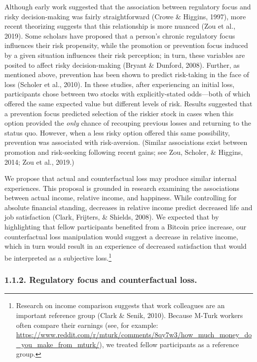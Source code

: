 \documentclass[man,floatsintext]{apa6}
\let\rmarkdownfootnote\footnote%
\def\footnote{\protect\rmarkdownfootnote}
\begin{document}
Although early work suggested that the association between regulatory focus and risky decision-making was fairly straightforward (Crowe \& Higgins, 1997), more recent theorizing suggests that this relationship is more nuanced (Zou et al., 2019). Some scholars have proposed that a person's chronic regulatory focus influences their risk propensity, while the promotion or prevention focus induced by a given situation influences their risk perception; in turn, these variables are posited to affect risky decision-making (Bryant \& Dunford, 2008). Further, as mentioned above, prevention has been shown to predict risk-taking in the face of loss (Scholer et al., 2010). In these studies, after experiencing an initial loss, participants chose between two stocks with explicitly-stated odds---both of which offered the same expected value but different levels of risk. Results suggested that a prevention focus predicted selection of the riskier stock in cases when this option provided the \emph{only} chance of recouping previous losses and returning to the status quo. However, when a less risky option offered this same possibility, prevention was associated with risk-aversion. (Similar associations exist between promotion and risk-seeking following recent gains; see Zou, Scholer, \& Higgins, 2014; Zou et al., 2019.)

We propose that actual and counterfactual loss may produce similar internal experiences. This proposal is grounded in research examining the associations between actual income, relative income, and happiness. While controlling for absolute financial standing, decreases in relative income predict decreased life and job satisfaction (Clark, Frijters, \& Shields, 2008). We expected that by highlighting that fellow participants benefited from a Bitcoin price increase, our counterfactual loss manipulation would suggest a decrease in relative income, which in turn would result in an experience of decreased satisfaction that would be interpreted as a subjective loss.\footnote{Research on income comparison suggests that work colleagues are an important reference group (Clark \& Senik, 2010). Because M-Turk workers often compare their earnings (see, for example: \url{https://www.reddit.com/r/mturk/comments/8qy7w3/how_much_money_do_you_make_from_mturk/}), we treated fellow participants as a reference group.}

\hypertarget{regulatory-focus-and-counterfactual-loss.}{%
\subsubsection{1.1.2. Regulatory focus and counterfactual loss.}\label{regulatory-focus-and-counterfactual-loss.}}
\end{document}
